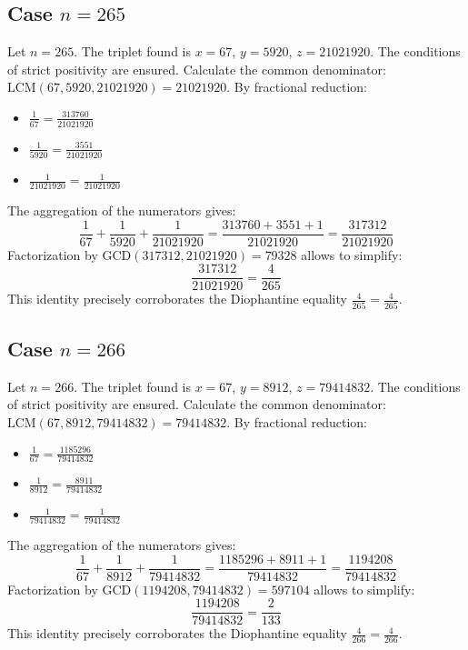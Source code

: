 \documentclass[11pt,a4paper]{article}
\begin{document}
\subsection{Case $n = 265$}
Let $n = 265$. The triplet found is $x = 67$, $y = 5920$, $z = 21021920$.
The conditions of strict positivity are ensured.
Calculate the common denominator: $\text{LCM}(67, 5920, 21021920) = 21021920$.
By fractional reduction:
\begin{itemize}
    \item $\frac{1}{67} = \frac{313760}{21021920}$
    \item $\frac{1}{5920} = \frac{3551}{21021920}$
    \item $\frac{1}{21021920} = \frac{1}{21021920}$
\end{itemize}
The aggregation of the numerators gives:
$$ \frac{1}{67} + \frac{1}{5920} + \frac{1}{21021920} = \frac{313760 + 3551 + 1}{21021920} = \frac{317312}{21021920} $$
Factorization by $\text{GCD}(317312, 21021920) = 79328$ allows to simplify:
$$ \frac{317312}{21021920} = \frac{4}{265} $$
This identity precisely corroborates the Diophantine equality $\frac{4}{265} = \frac{4}{265}$.

\subsection{Case $n = 266$}
Let $n = 266$. The triplet found is $x = 67$, $y = 8912$, $z = 79414832$.
The conditions of strict positivity are ensured.
Calculate the common denominator: $\text{LCM}(67, 8912, 79414832) = 79414832$.
By fractional reduction:
\begin{itemize}
    \item $\frac{1}{67} = \frac{1185296}{79414832}$
    \item $\frac{1}{8912} = \frac{8911}{79414832}$
    \item $\frac{1}{79414832} = \frac{1}{79414832}$
\end{itemize}
The aggregation of the numerators gives:
$$ \frac{1}{67} + \frac{1}{8912} + \frac{1}{79414832} = \frac{1185296 + 8911 + 1}{79414832} = \frac{1194208}{79414832} $$
Factorization by $\text{GCD}(1194208, 79414832) = 597104$ allows to simplify:
$$ \frac{1194208}{79414832} = \frac{2}{133} $$
This identity precisely corroborates the Diophantine equality $\frac{4}{266} = \frac{4}{266}$.
\end{document}
